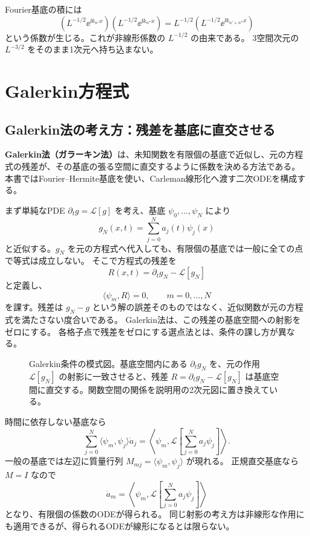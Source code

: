 Fourier基底の積には
\[
(L^{-1/2}\ee^{\ii k_{n'}x})(L^{-1/2}\ee^{\ii k_{n''}x})
=L^{-1/2}(L^{-1/2}\ee^{\ii k_{n'+n''}x})
\]
という係数が生じる。これが非線形係数の $L^{-1/2}$ の由来である。
3空間次元の $L^{-3/2}$ をそのまま1次元へ持ち込まない。

\section{Galerkin方程式}
\subsection{Galerkin法の考え方：残差を基底に直交させる}
\textbf{Galerkin法（ガラーキン法）}は、未知関数を有限個の基底で近似し、元の方程式の残差が、その基底の張る空間に直交するように係数を決める方法である。
本書ではFourier--Hermite基底を使い、Carleman線形化へ渡す二次ODEを構成する。

まず単純なPDE $\partial_tg=\mathcal L[g]$ を考え、基底 $\psi_0,\ldots,\psi_N$ により
\[
g_N(x,t)=\sum_{j=0}^{N}a_j(t)\psi_j(x)
\]
と近似する。$g_N$ を元の方程式へ代入しても、有限個の基底では一般に全ての点で等式は成立しない。
そこで方程式の残差を
\[
R(x,t)=\partial_tg_N-\mathcal L[g_N]
\]
と定義し、
\[
\boxed{\langle\psi_m,R\rangle=0,\qquad m=0,\ldots,N}
\]
を課す。残差は $g_N-g$ という解の誤差そのものではなく、近似関数が元の方程式を満たさない度合いである。
Galerkin法は、この残差の基底空間への射影をゼロにする。
各格子点で残差をゼロにする選点法とは、条件の課し方が異なる。

\begin{figure}[htbp]
\centering

\caption{Galerkin条件の模式図。基底空間内にある $\partial_tg_N$ を、元の作用 $\mathcal L[g_N]$ の射影に一致させると、残差 $R=\partial_tg_N-\mathcal L[g_N]$ は基底空間に直交する。関数空間の関係を説明用の2次元図に置き換えている。}
\label{fig:galerkin-residual}
\end{figure}

時間に依存しない基底なら
\[
\sum_{j=0}^{N}\langle\psi_m,\psi_j\rangle\dot a_j
=\left\langle\psi_m,\mathcal L\left[\sum_{j=0}^{N}a_j\psi_j\right]\right\rangle.
\]
一般の基底では左辺に質量行列 $M_{mj}=\langle\psi_m,\psi_j\rangle$ が現れる。
正規直交基底なら $M=I$ なので
\[
\boxed{\dot a_m=
\left\langle\psi_m,\mathcal L\left[\sum_{j=0}^{N}a_j\psi_j\right]\right\rangle}
\]
となり、有限個の係数のODEが得られる。
同じ射影の考え方は非線形な作用にも適用できるが、得られるODEが線形になるとは限らない。

